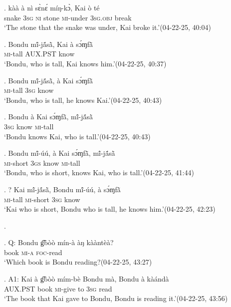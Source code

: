\documentclass{assets/fieldnotes}
\begin{document}
\exg. kàà à nì sɛ̀nɛ́ míŋ-kɔ̀, Kai ò té\\
snake \textsc{3sg} \textsc{ni} stone \textsc{mi}-under {} \textsc{3sg.obj} break\\
`The stone that the snake was under, Kai broke it.’\hfill{(04-22-25, 40:04)}


\exg. Bondu mĩ́-jã́sã̀, Kai à sɔ́ɱfã̀\\
{} \textsc{mi}-tall {} \textsc{AUX.PST} know\\
`Bondu, who is tall, Kai knows him.’\hfill{(04-22-25, 40:37)}

\exg. Bondu mĩ́-jã́sã̀, à Kai sɔ́ɱfã̀\\
{} \textsc{mi}-tall \textsc{3sg} {} know\\
`Bondu, who is tall, he knows Kai.’\hfill{(04-22-25, 40:43)}

\exg. Bondu à Kai sɔ́ɱfã̀, mĩ́-jã́sã̀\\
{} \textsc{3sg} {} know \textsc{mi}-tall\\
`Bondu knows Kai, who is tall.’\hfill{(04-22-25, 40:43)}

\exg. Bondu mĩ́-úú, à Kai sɔ́ɱfã̀, mĩ́-jã́sã̀\\
{} \textsc{mi}-short \textsc{3gs} {} know \textsc{mi}-tall\\
`Bondu, who is short, knows Kai, who is tall.’\hfill{(04-22-25, 41:44)}

 \exg. ? Kai mĩ́-jã́sã̀, Bondu mĩ́-úú, à sɔ́ɱfã̀\\
{} \textsc{mi}-tall {} \textsc{mi}-short \textsc{3sg} know\\
`Kai who is short, Bondu who is tall, he knows him.’\hfill{(04-22-25, 42:23)}\\


\exg.

\ag. Q: Bondu g͡bòò mín-à àŋ kààntèà?\\
{} {} book \textsc{mi-a} \textsc{foc}-read\\
`Which book is Bondu reading?\hfill{(04-22-25, 43:27)}

\bg. A1: Kai à g͡bòò mím-bè Bondu mà, Bondu à kàándà\\
{} {} \textsc{AUX.PST} book \textsc{mi}-give {} to {} \textsc{3sg} read\\
`The book that Kai gave to Bondu, Bondu is reading it.’\hfill{(04-22-25, 43:56)}
\end{document}
